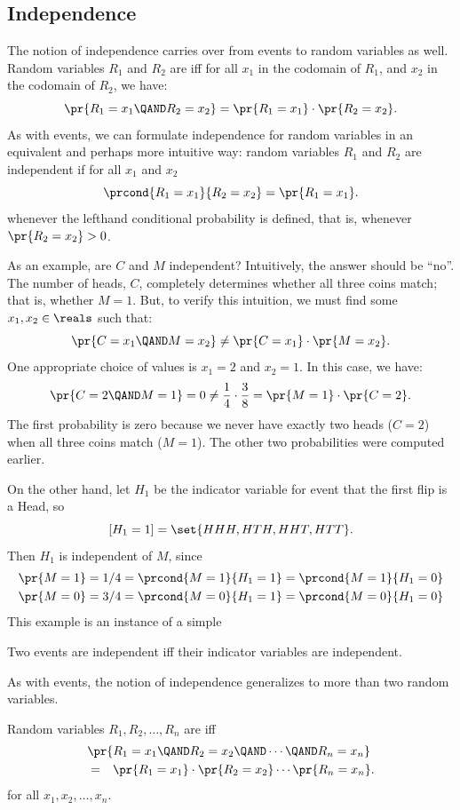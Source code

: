 \subsection{Independence}

The notion of independence carries over from events to random
variables as well.  Random variables $R_1$ and $R_2$ are
 iff for all $x_1$ in the codomain
of $R_1$, and $x_2$  in the codomain of $R_2$, we have:
\[
\pr{R_1 = x_1 \QAND R_2 = x_2}  =  \pr{R_1 = x_1} \cdot \pr{R_2 = x_2}.
\]
As with events, we can formulate independence for random
variables in an equivalent and perhaps more intuitive way: random
variables $R_1$ and $R_2$ are independent if for all $x_1$ and $x_2$
\[
\prcond{R_1 = x_1}{R_2 = x_2}  =  \pr{R_1 = x_1}.
\]
whenever the lefthand conditional probability is defined, that is,
whenever $\pr{R_2 = x_2} > 0$.

As an example, are $C$ and $M$ independent?  Intuitively, the answer
should be ``no''.  The number of heads, $C$, completely determines
whether all three coins match; that is, whether $M = 1$.  But, to
verify this intuition, we must find some $x_1, x_2 \in \reals$
such that:
\[
\pr{C = x_1 \QAND M = x_2} \neq \pr{C = x_1} \cdot \pr{M = x_2}.
\]
One appropriate choice of values is $x_1 = 2$ and $x_2 = 1$.
In this case, we have:
\[
\pr{C = 2 \QAND M = 1} = 0 \neq \dfrac{1}{4} \cdot \dfrac{3}{8} = \pr{M
= 1} \cdot \pr{C = 2}.
\]
The first probability is zero because we never have exactly two heads ($C
= 2$) when all three coins match ($M = 1$).  The other two probabilities
were computed earlier.

On the other hand, let $H_1$ be the indicator variable for event that the
first flip is a Head, so
\[
[H_1 = 1] = \set{HHH, HTH, HHT, HTT}.
\]
Then $H_1$ is independent of $M$, since
\begin{align*}
\pr{M=1} & = 1/4 = \prcond{M=1}{H_1=1} = \prcond{M=1}{H_1=0}\\
\pr{M=0} & = 3/4 = \prcond{M=0}{H_1=1} = \prcond{M=0}{H_1=0}
\end{align*}
This example is an instance of a simple
\begin{lemma}
  Two events are independent iff their indicator variables are
  independent.
\end{lemma}
As with events, the notion of independence generalizes to more than two
random variables.
\begin{definition}
Random variables $R_1, R_2, \dots, R_n$ are  iff
\begin{eqnarray*}
\lefteqn{\pr{R_1 = x_1 \QAND R_2 = x_2 \QAND \cdots \QAND R_n = x_n}}\\
        & = & \pr{R_1 = x_1} \cdot \pr{R_2 = x_2} \cdots \pr{R_n = x_n}.
\end{eqnarray*}
for all $x_1, x_2, \dots, x_n$.
\end{definition}

